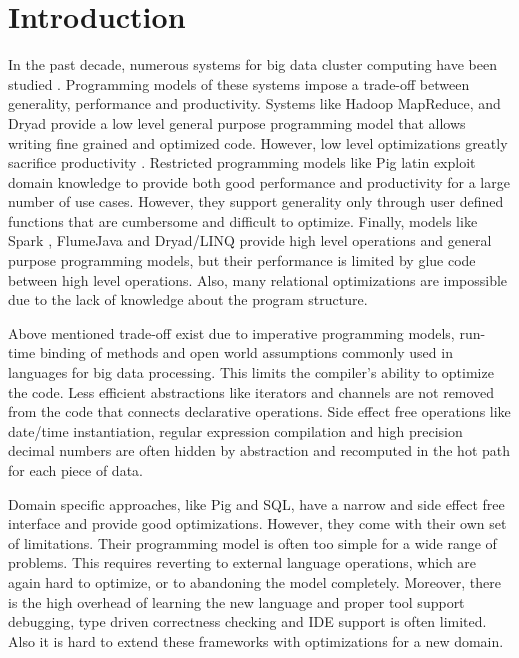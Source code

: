 \section{Introduction}
\label{sec:introduction}

In the past decade, numerous systems for big data cluster computing have been studied \cite{dean_mapreduce:_2008, yu_dryadlinq:_2008-1, olston_pig_2008-1, thusoo_hive_2010-1, spark-nsdi}. Programming models of these systems impose a trade-off between generality, performance and productivity. Systems like Hadoop MapReduce, \cite{hadoop} and Dryad \cite{isard_dryad:_2007} provide a low level general purpose programming model that allows writing fine grained and optimized code. However, low level optimizations greatly sacrifice productivity \cite{chambers_flumejava:_2010}. Restricted programming models like Pig latin \cite{olston_pig_2008-1} exploit domain knowledge to provide both good performance and productivity for a large number of use cases. However, they support generality only through user defined functions that are cumbersome and difficult to optimize. Finally, models like Spark \cite{spark-nsdi}, FlumeJava \cite{chambers_flumejava:_2010} and Dryad/LINQ \cite{yu_dryadlinq:_2008-1} provide high level operations and general purpose programming models, but their performance is limited by glue code between high level operations. Also, many relational optimizations are impossible due to the lack of knowledge about the program structure. 

Above mentioned trade-off exist due to imperative programming models, run-time binding of methods and open world assumptions commonly used in languages for big data processing. This limits the compiler's ability to optimize the code. Less efficient abstractions like iterators and channels are not removed from the code that connects declarative operations. Side effect free operations like date/time instantiation, regular expression compilation and high precision decimal numbers are often hidden by abstraction and recomputed in the hot path for each piece of data. 

Domain specific approaches, like Pig and SQL, have a narrow and side effect free interface and provide good optimizations. However, they come with their own set of limitations. Their programming model is often too simple for a wide range of problems. This requires reverting to external language operations, which are again hard to optimize, or to abandoning the model completely. Moreover, there is the high overhead of learning the new language and proper tool support debugging, type driven correctness checking and IDE support is often limited. Also it is hard to extend these frameworks with optimizations for a new domain.

